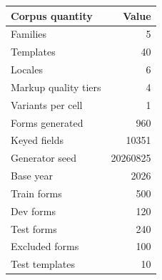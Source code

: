 \begingroup\small\setlength{\tabcolsep}{4pt}
\begin{tabular}{lr}
\toprule
\textbf{Corpus quantity} & \textbf{Value} \\
\midrule
Families & 5 \\  %
Templates & 40 \\  %
Locales & 6 \\  %
Markup quality tiers & 4 \\  %
Variants per cell & 1 \\  %
Forms generated & 960 \\  %
Keyed fields & 10351 \\  %
Generator seed & 20260825 \\  %
Base year & 2026 \\  %
\midrule
Train forms & 500 \\  %
Dev forms & 120 \\  %
Test forms & 240 \\  %
Excluded forms & 100 \\  %
Test templates & 10 \\  %
\bottomrule
\end{tabular}
\endgroup
\par\smallskip{}
\par{}
\par{}
